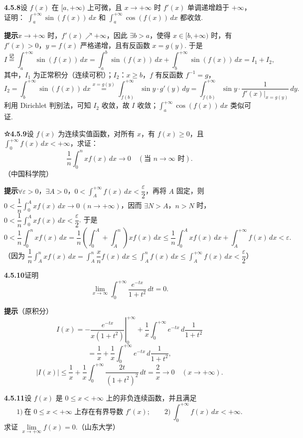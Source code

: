 \documentclass[UTF8,12pt,a4paper,fontset=fandol]{ctexart}
\begin{document}
\noindent\textbf{4.5.8}\quad 设 $f(x)$ 在 $[a,+\infty)$ 上可微，且 $x\to+\infty$ 时 $f'(x)$ 单调递增趋于 $+\infty$，证明：
$\displaystyle\int_a^{+\infty}\sin(f(x))\,dx$ 和 $\displaystyle\int_a^{+\infty}\cos(f(x))\,dx$ 都收敛.

\noindent\textbf{提示}\quad $x\to+\infty$ 时，$f'(x)\nearrow+\infty$，因此 $\exists b>a$，使得 $x\in[b,+\infty)$ 时，有 $f'(x)>0$，$y=f(x)$ 严格递增，且有反函数 $x=g(y)$. 于是
\[
I\stackrel{\text{记}}{=}\int_a^{+\infty}\sin(f(x))\,dx
=\int_a^b\sin(f(x))\,dx+\int_b^{+\infty}\sin(f(x))\,dx=I_1+I_2,
\]
其中，$I_1$ 为正常积分（连续可积）；$I_2$：$x\ge b$，$f$ 有反函数 $f^{-1}=g$，
\[
I_2=\int_b^{+\infty}\sin(f(x))\,dx
\stackrel{x=g(y)}{=}\int_{f(b)}^{+\infty}\sin y\cdot g'(y)\,dy
=\int_{f(b)}^{+\infty}\sin y\cdot\frac1{f'(x)|_{x=g(y)}}\,dy.
\]
利用 Dirichlet 判别法，可知 $I_2$ 收敛，故 $I$ 收敛；$\displaystyle\int_a^{+\infty}\cos(f(x))\,dx$ 类似可证.

\noindent\textbf{☆4.5.9}\quad 设 $f(x)$ 为连续实值函数，对所有 $x$，有 $f(x)\ge0$，且
$\displaystyle\int_0^{+\infty}f(x)\,dx<+\infty$，求证：
\[
\frac1n\int_0^nxf(x)\,dx\longrightarrow0\quad(\text{当 }n\to\infty\text{ 时}).
\]
（中国科学院）

\noindent\textbf{提示}\quad $\forall\varepsilon>0$，$\exists A>0$，$0<\displaystyle\int_A^{+\infty}f(x)\,dx<\dfrac\varepsilon2$，再将 $A$ 固定，则
$0<\dfrac1n\displaystyle\int_0^Axf(x)\,dx\to0\ (n\to+\infty)$，因而 $\exists N>A$，$n>N$ 时，
$0<\dfrac1n\displaystyle\int_0^Axf(x)\,dx<\dfrac\varepsilon2$. 于是
\[
0<\frac1n\int_0^nxf(x)\,dx
=\frac1n\left(\int_0^A+\int_A^n\right)xf(x)\,dx
\le\frac1n\int_0^Axf(x)\,dx+\int_A^{+\infty}f(x)\,dx<\varepsilon.
\]
（因为 $\dfrac1n\displaystyle\int_A^nxf(x)\,dx=\displaystyle\int_A^n\dfrac xn f(x)\,dx
\le\displaystyle\int_A^n f(x)\,dx\le\displaystyle\int_A^{+\infty}f(x)\,dx<\dfrac\varepsilon2$）

\noindent\textbf{4.5.10}\quad 证明
\[
\lim_{x\to\infty}\int_0^{+\infty}\frac{e^{-tx}}{1+t^2}\,dt=0.
\]

\noindent\textbf{提示}\quad （原积分）
\[
I(x)=-\left.\frac{e^{-tx}}{x(1+t^2)}\right|_0^{+\infty}
+\frac1x\int_0^{+\infty}e^{-tx}\,d\frac1{1+t^2}
\]
\[
=\frac1x+\frac1x\int_0^{+\infty}e^{-tx}\,d\frac1{1+t^2},
\]
\[
|I(x)|\le\frac1x+\frac1x\int_0^{+\infty}\frac{2t}{(1+t^2)^2}\,dt=\frac2x\to0\quad(x\to+\infty).
\]

\noindent\textbf{4.5.11}\quad 设 $f(x)$ 是 $0\le x<+\infty$ 上的非负连续函数，并且满足
\[
1)\ \text{在 }0\le x<+\infty\text{ 上存在有界导数 }f'(x);\qquad
2)\ \int_0^{+\infty}f(x)\,dx<+\infty.
\]
求证 $\lim\limits_{x\to+\infty}f(x)=0$.（山东大学）
\end{document}
